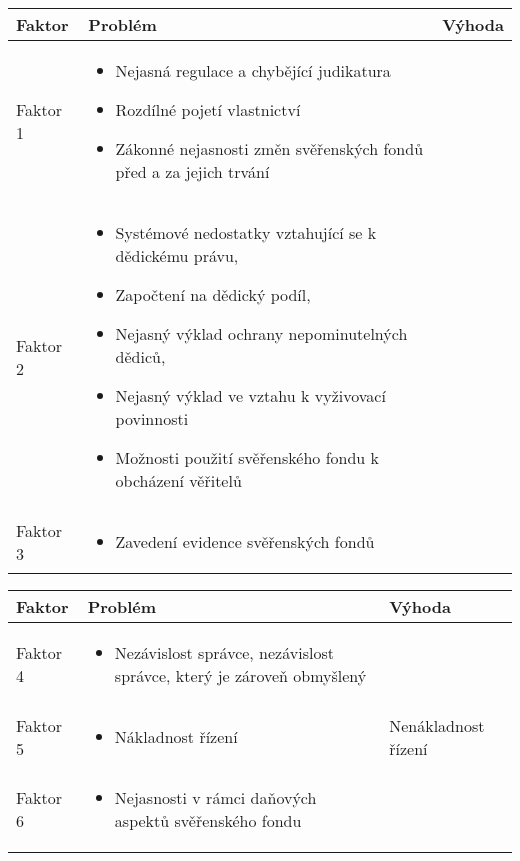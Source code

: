 \documentclass{article}
\begin{document}
\noindent\begin{tabularx}{\textwidth}{X|X|X}
\textbf{Faktor} & \textbf{Problém} & \textbf{Výhoda} \\
\hline
Faktor 1 & 
\begin{itemize}
\item Nejasná regulace a chybějící judikatura 
\item Rozdílné pojetí vlastnictví
\item Zákonné nejasnosti změn svěřenských fondů před a za jejich trvání
\end{itemize}
& \\
\hline
Faktor 2 & 
\begin{itemize} 
\item Systémové nedostatky vztahující se k dědickému právu,
\item Započtení na dědický podíl,
\item Nejasný výklad ochrany nepominutelných dědiců,
\item Nejasný výklad ve vztahu k vyživovací povinnosti
\item Možnosti použití svěřenského fondu k obcházení věřitelů
\end{itemize} 
& \\
\hline
Faktor 3 & 
\begin{itemize}
\item Zavedení evidence svěřenských fondů
\end{itemize}
& \\
\hline
\end{tabularx}

\newpage
\thispagestyle{smallertextinheader}

\noindent\begin{tabularx}{\textwidth}{X|X|X}
\textbf{Faktor} & \textbf{Problém} & \textbf{Výhoda} \\
\hline
Faktor 4 & 
\begin{itemize}
\item Nezávislost správce, nezávislost správce, který je zároveň obmyšlený
\end{itemize}
& \\
\hline
Faktor 5 & 
\begin{itemize}
\item Nákladnost řízení
\end{itemize}
& Nenákladnost řízení\\
\hline
Faktor 6 & 
\begin{itemize}
\item Nejasnosti v rámci daňových aspektů svěřenského fondu
\end{itemize}
& \\
\hline
\end{tabularx}
\end{document}
